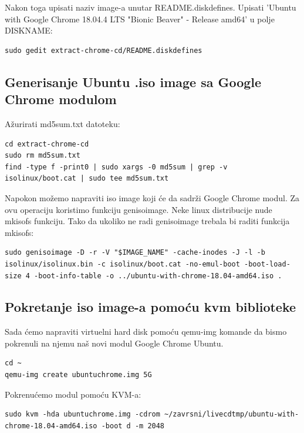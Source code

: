 \documentclass[12pt,vi]{mitthesis}
\begin{document}
\noindent
Nakon toga upisati naziv image-a unutar README.diskdefines. 
Upisati 'Ubuntu with Google Chrome 18.04.4 LTS "Bionic Beaver" - Release amd64' u polje DISKNAME:
\begin{lstlisting}[style=BashInputStyle]
sudo gedit extract-chrome-cd/README.diskdefines
\end{lstlisting}

\subsection*{Generisanje Ubuntu .iso image sa Google Chrome modulom}
\noindent
Ažurirati md5sum.txt datoteku:
\begin{lstlisting}[style=BashInputStyle]
cd extract-chrome-cd
sudo rm md5sum.txt
find -type f -print0 | sudo xargs -0 md5sum | grep -v isolinux/boot.cat | sudo tee md5sum.txt
\end{lstlisting}

\noindent
Napokon možemo napraviti iso image koji će da sadrži Google Chrome modul. Za ovu operaciju koristimo funkciju genisoimage. Neke linux distribucije nude mkisofs funkciju. Tako da ukoliko ne radi genisoimage trebala bi raditi funkcija mkisofs:
\begin{lstlisting}[style=BashInputStyle]
sudo genisoimage -D -r -V "$IMAGE_NAME" -cache-inodes -J -l -b isolinux/isolinux.bin -c isolinux/boot.cat -no-emul-boot -boot-load-size 4 -boot-info-table -o ../ubuntu-with-chrome-18.04-amd64.iso .
\end{lstlisting}

\subsection*{Pokretanje iso image-a pomoću kvm biblioteke}
\indent
Sada ćemo napraviti virtuelni hard disk pomoću qemu-img komande da bismo pokrenuli na njemu naš novi modul Google Chrome Ubuntu.
\begin{lstlisting}[style=BashInputStyle]
cd ~
qemu-img create ubuntuchrome.img 5G
\end{lstlisting}

\noindent 
Pokrenućemo modul pomoću KVM-a:
\begin{lstlisting}[style=BashInputStyle]
sudo kvm -hda ubuntuchrome.img -cdrom ~/zavrsni/livecdtmp/ubuntu-with-chrome-18.04-amd64.iso -boot d -m 2048
\end{lstlisting}
\end{document}
